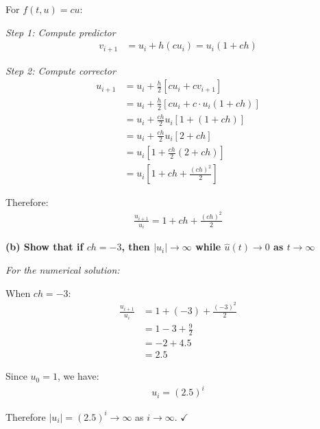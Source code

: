 \documentclass[reqno, answers]{exam}
\begin{document}
\begin{enumerate}
\begin{solution}
          For $f(t,u) = cu$:

          \textit{Step 1: Compute predictor}
          \begin{align*}
            v_{i+1} & = u_i + h(cu_i) = u_i(1 + ch)
          \end{align*}

          \textit{Step 2: Compute corrector}
          \begin{align*}
            u_{i+1} & = u_i + \frac{h}{2}[cu_i + cv_{i+1}]            \\
                    & = u_i + \frac{h}{2}[cu_i + c \cdot u_i(1 + ch)] \\
                    & = u_i + \frac{ch}{2}u_i[1 + (1 + ch)]           \\
                    & = u_i + \frac{ch}{2}u_i[2 + ch]                 \\
                    & = u_i\left[1 + \frac{ch}{2}(2 + ch)\right]      \\
                    & = u_i\left[1 + ch + \frac{(ch)^2}{2}\right]
          \end{align*}

          Therefore:
          \begin{align*}
            \boxed{\frac{u_{i+1}}{u_i} = 1 + ch + \frac{(ch)^2}{2}}
          \end{align*}

          \medskip

          \textbf{(b) Show that if $ch = -3$, then $|u_i| \to \infty$ while $\hat{u}(t) \to 0$ as $t \to \infty$}

          \textit{For the numerical solution:}

          When $ch = -3$:
          \begin{align*}
            \frac{u_{i+1}}{u_i} & = 1 + (-3) + \frac{(-3)^2}{2} \\
                                & = 1 - 3 + \frac{9}{2}         \\
                                & = -2 + 4.5                    \\
                                & = 2.5
          \end{align*}

          Since $u_0 = 1$, we have:
          \begin{align*}
            u_i = (2.5)^i
          \end{align*}

          Therefore $|u_i| = (2.5)^i \to \infty$ as $i \to \infty$. \quad $\checkmark$


\end{solution}
\end{enumerate}
\end{document}
